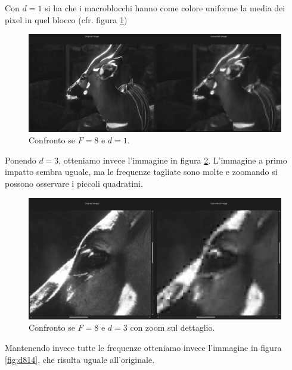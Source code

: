 \documentclass[12pt]{article}
\begin{document}
Con $d=1$ si ha che i macroblocchi hanno come colore uniforme la media dei pixel in quel blocco (cfr. figura \ref{fig:d81})

\begin{figure}[!ht]
    \begin{center}
    \includegraphics[width=\textwidth]{images/deer-8-1.png}
    \caption{Confronto se $F=8$ e $d=1$.}
    \label{fig:d81}
    \end{center}
\end{figure}

Ponendo $d=3$, otteniamo invece l'immagine in figura \ref{fig:d83}. L'immagine a primo impatto sembra uguale, ma le frequenze tagliate sono molte e zoomando si possono osservare i piccoli quadratini.

\begin{figure}[!ht]
    \begin{center}
    \includegraphics[scale=0.2]{images/deer-8-3-zoom.png}
    \caption{Confronto se $F=8$ e $d=3$ con zoom sul dettaglio.}
    \label{fig:d83}
    \end{center}
\end{figure}

Mantenendo invece tutte le frequenze otteniamo invece l'immagine in figura \ref{fig:d814}, che risulta uguale all'originale.
\end{document}
